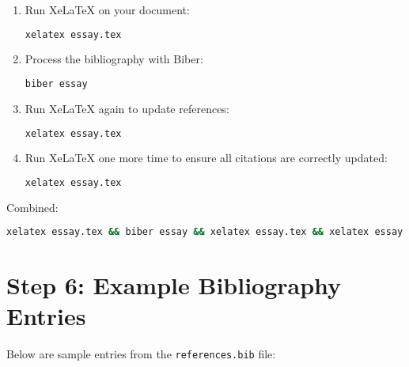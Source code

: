 \documentclass{article}
\begin{document}
\begin{enumerate}
    \item Run XeLaTeX on your document:
          \begin{lstlisting}[language=bash]
xelatex essay.tex
          \end{lstlisting}

    \item Process the bibliography with Biber:
          \begin{lstlisting}[language=bash]
biber essay
          \end{lstlisting}

    \item Run XeLaTeX again to update references:
          \begin{lstlisting}[language=bash]
xelatex essay.tex
          \end{lstlisting}

    \item Run XeLaTeX one more time to ensure all citations are correctly updated:
          \begin{lstlisting}[language=bash]
xelatex essay.tex
        \end{lstlisting}
\end{enumerate}

Combined:
\begin{lstlisting}[language=bash]
xelatex essay.tex && biber essay && xelatex essay.tex && xelatex essay.tex
\end{lstlisting}

\clearpage

\section*{Step 6: Example Bibliography Entries}

Below are sample entries from the \texttt{references.bib} file:
\end{document}
